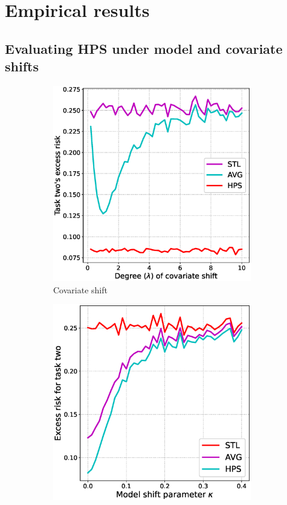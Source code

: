 \section{Empirical results}

\subsection{Evaluating HPS under model and covariate shifts}

\begin{figure}[!t]
	\begin{subfigure}[b]{0.33\textwidth}
		\centering
		\includegraphics[width=0.95\textwidth]{figures/compare_risk_covariate_shift.eps}
		\caption{Covariate shift}
		\label{fig_sec5_covariate}
	\end{subfigure}\hfill%
	\begin{subfigure}[b]{0.33\textwidth}
		\centering
		\includegraphics[width=0.95\textwidth]{figures/compare_risk_model_shift.eps}

\end{subfigure}
\end{figure}
